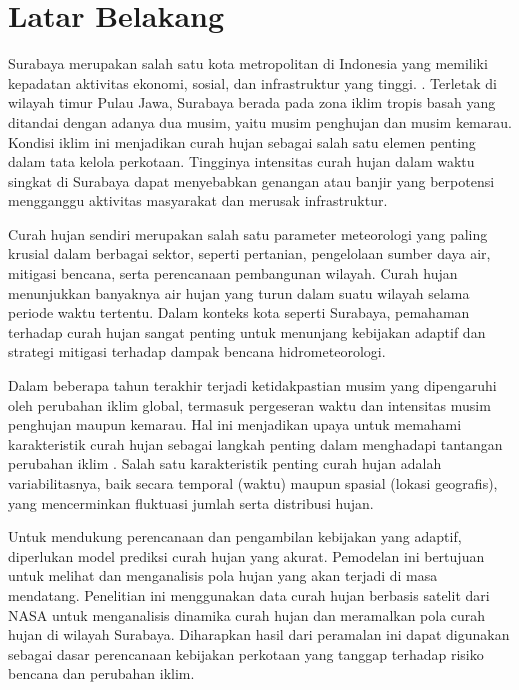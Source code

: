 \section{Latar Belakang}
Surabaya merupakan salah satu kota metropolitan di Indonesia yang memiliki kepadatan aktivitas ekonomi, sosial, dan infrastruktur yang tinggi. \citep{saesarin2020skripsi}. Terletak di wilayah timur Pulau Jawa, Surabaya berada pada zona iklim tropis basah yang ditandai dengan adanya dua musim, yaitu musim penghujan dan musim kemarau. Kondisi iklim ini menjadikan curah hujan sebagai salah satu elemen penting dalam tata kelola perkotaan. Tingginya intensitas curah hujan dalam waktu singkat di Surabaya dapat menyebabkan genangan atau banjir yang berpotensi mengganggu aktivitas masyarakat dan merusak infrastruktur. \citep{febriana2019prediksi} 

Curah hujan sendiri merupakan salah satu parameter meteorologi yang paling krusial dalam berbagai sektor, seperti pertanian, pengelolaan sumber daya air, mitigasi bencana, serta perencanaan pembangunan wilayah. Curah hujan menunjukkan banyaknya air hujan yang turun dalam suatu wilayah selama periode waktu tertentu. Dalam konteks kota seperti Surabaya, pemahaman terhadap curah hujan sangat penting untuk menunjang kebijakan adaptif dan strategi mitigasi terhadap dampak bencana hidrometeorologi.\citep{azka2018gpm}

Dalam beberapa tahun terakhir terjadi ketidakpastian musim yang dipengaruhi oleh perubahan iklim global, termasuk pergeseran waktu dan intensitas musim penghujan maupun kemarau. Hal ini menjadikan upaya untuk memahami karakteristik curah hujan sebagai langkah penting dalam menghadapi tantangan perubahan iklim \citep{sofia2018merapi}. Salah satu karakteristik penting curah hujan adalah variabilitasnya, baik secara temporal (waktu) maupun spasial (lokasi geografis), yang mencerminkan fluktuasi jumlah serta distribusi hujan. 

Untuk mendukung perencanaan dan pengambilan kebijakan yang adaptif, diperlukan model prediksi curah hujan yang akurat. Pemodelan ini bertujuan untuk melihat dan menganalisis pola hujan yang akan terjadi di masa mendatang. Penelitian ini menggunakan data curah hujan berbasis satelit dari NASA untuk menganalisis dinamika curah hujan dan meramalkan pola curah hujan di wilayah Surabaya. Diharapkan hasil dari peramalan ini dapat digunakan sebagai dasar perencanaan kebijakan perkotaan yang tanggap terhadap risiko bencana dan perubahan iklim.

